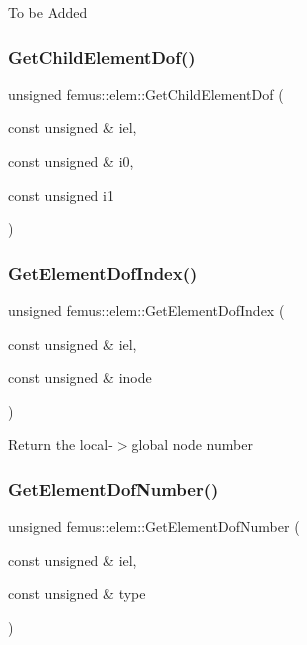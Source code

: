To be Added \mbox{\label{classfemus_1_1elem_a9063f54e2f2d3989c68984542888cf4b}} 
\subsubsection{\texorpdfstring{Get\+Child\+Element\+Dof()}{GetChildElementDof()}}
{\footnotesize\ttfamily unsigned femus\+::elem\+::\+Get\+Child\+Element\+Dof (\begin{DoxyParamCaption}\item[{const unsigned \&}]{iel,  }\item[{const unsigned \&}]{i0,  }\item[{const unsigned}]{i1 }\end{DoxyParamCaption})}

\mbox{\label{classfemus_1_1elem_a77bb25f38a4ae2ee0a6e4d3edcf3ba56}} 
\subsubsection{\texorpdfstring{Get\+Element\+Dof\+Index()}{GetElementDofIndex()}}
{\footnotesize\ttfamily unsigned femus\+::elem\+::\+Get\+Element\+Dof\+Index (\begin{DoxyParamCaption}\item[{const unsigned \&}]{iel,  }\item[{const unsigned \&}]{inode }\end{DoxyParamCaption})}

Return the local-\/$>$global node number \mbox{\label{classfemus_1_1elem_aabfd00a1d57b475aec7a3c3622c82668}} 
\subsubsection{\texorpdfstring{Get\+Element\+Dof\+Number()}{GetElementDofNumber()}}
{\footnotesize\ttfamily unsigned femus\+::elem\+::\+Get\+Element\+Dof\+Number (\begin{DoxyParamCaption}\item[{const unsigned \&}]{iel,  }\item[{const unsigned \&}]{type }\end{DoxyParamCaption})}

